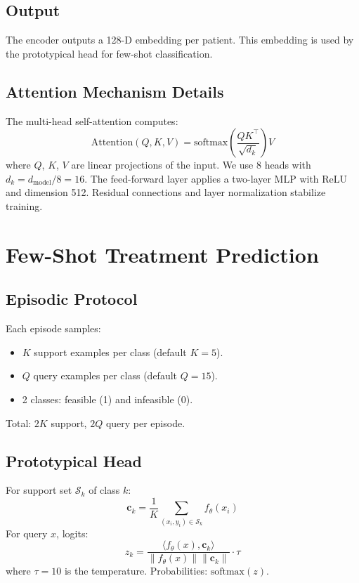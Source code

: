 \subsection{Output}

The encoder outputs a 128-D embedding per patient. This embedding is used by the prototypical head for few-shot classification.

\subsection{Attention Mechanism Details}

The multi-head self-attention computes:
\begin{equation}
\text{Attention}(Q, K, V) = \text{softmax}\left(\frac{QK^\top}{\sqrt{d_k}}\right) V
\end{equation}
where $Q$, $K$, $V$ are linear projections of the input. We use 8 heads with $d_k = d_{\text{model}}/8 = 16$. The feed-forward layer applies a two-layer MLP with ReLU and dimension 512. Residual connections and layer normalization stabilize training.

\section{Few-Shot Treatment Prediction}

\subsection{Episodic Protocol}

Each episode samples:
\begin{itemize}
\item $K$ support examples per class (default $K=5$).
\item $Q$ query examples per class (default $Q=15$).
\item 2 classes: feasible (1) and infeasible (0).
\end{itemize}
Total: $2K$ support, $2Q$ query per episode.

\subsection{Prototypical Head}

For support set $\mathcal{S}_k$ of class $k$:
\begin{equation}
\mathbf{c}_k = \frac{1}{K} \sum_{(x_i, y_i) \in \mathcal{S}_k} f_\theta(x_i)
\end{equation}
For query $x$, logits:
\begin{equation}
z_k = \frac{\langle f_\theta(x), \mathbf{c}_k \rangle}{\|f_\theta(x)\| \|\mathbf{c}_k\|} \cdot \tau
\end{equation}
where $\tau = 10$ is the temperature. Probabilities: $\text{softmax}(z)$.

